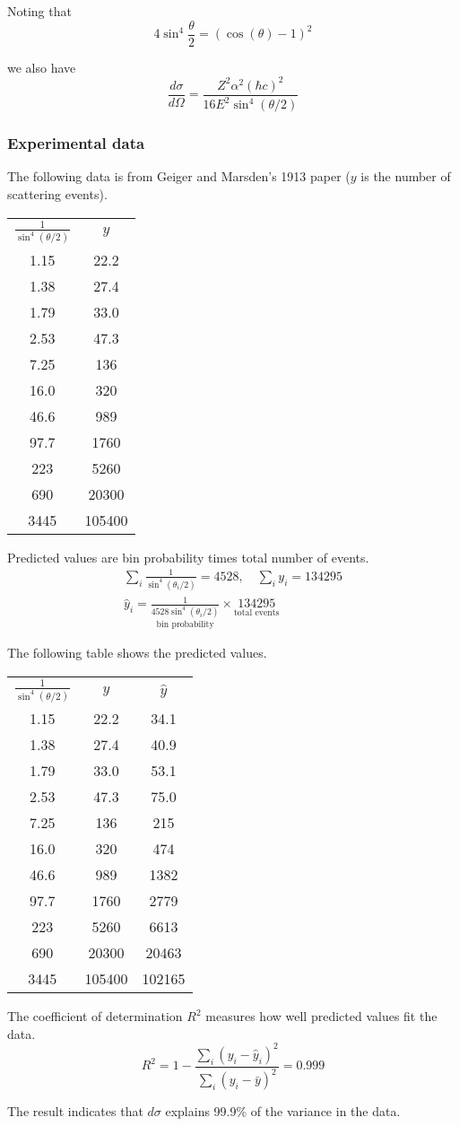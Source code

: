 Noting that
\begin{equation*}
4\sin^4\frac{\theta}{2}=(\cos(\theta)-1)^2
\end{equation*}

we also have
\begin{equation*}
\frac{d\sigma}{d\Omega}=\frac{Z^2\alpha^2(\hbar c)^2}{16E^2\sin^4(\theta/2)}
\end{equation*}

\subsubsection*{Experimental data}
The following data is from Geiger and Marsden's 1913 paper
($y$ is the number of scattering events).
\begin{center}
\begin{tabular}{cc}
$\displaystyle\frac{1}{\sin^4(\theta/2)}$ & $y$\\[3ex]
1.15 & 22.2\\
1.38 & 27.4\\
1.79 & 33.0\\
2.53 & 47.3\\
7.25 & 136\\
16.0 & 320\\
46.6 & 989\\
97.7 & 1760\\
223 & 5260\\
690 & 20300\\
3445 & 105400
\end{tabular}
\end{center}

Predicted values are bin probability times total number of events.
\begin{gather*}
\sum_i\frac{1}{\sin^4(\theta_i/2)}=4528,\quad
\sum_iy_i=134295
\\
\hat y_i=\underset{\text{bin probability}}{\frac{1}{4528\sin^4(\theta_i/2)}}\times
\underset{\text{total events}}{134295}
\end{gather*}

The following table shows the predicted values.
\begin{center}
\begin{tabular}{ccc}
$\displaystyle\frac{1}{\sin^4(\theta/2)}$ & $y$ & $\hat y$\\[3ex]
1.15 & 22.2 & 34.1\\
1.38 & 27.4 & 40.9\\
1.79 & 33.0 & 53.1\\
2.53 & 47.3 & 75.0\\
7.25 & 136 & 215\\
16.0 & 320 & 474\\
46.6 & 989 & 1382\\
97.7 & 1760 & 2779\\
223 & 5260 & 6613\\
690 & 20300 & 20463\\
3445 & 105400 & 102165
\end{tabular}
\end{center}

The coefficient of determination $R^2$ measures how well predicted values fit the data.
\begin{equation*}
R^2=1-\frac{\sum_i(y_i-\hat y_i)^2}{\sum_i(y_i-\bar y)^2}=0.999
\end{equation*}

The result indicates that $d\sigma$ explains 99.9\%
of the variance in the data.


